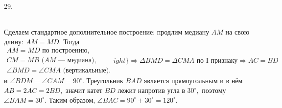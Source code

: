 29. \begin{figure}[ht!]
\end{figure}\\
Сделаем стандартное дополнительное построение: продлим медиану $AM$ на свою длину: $AM=MD.$ Тогда $\left.\begin{array}{l}AM=MD\text{ по построению},\\
 CM=MB\text{ ($AM$ --- медиана)},\\ \angle BMD=\angle CMA\text{ (вертикальные).}\end{array}
ight\}\Rightarrow
\Delta BMD=\Delta CMA\text{ по I признаку}\Rightarrow AC=BD$ и $\angle BDM=\angle CAM=90^\circ.$ Треугольник $BAD$ является прямоугольным и в нём $AB=2AC=2BD,$ значит катет $BD$ лежит напротив угла в $30^\circ,$ поэтому $\angle BAM=30^\circ.$ Таким образом, $\angle BAC=90^\circ+30^\circ=120^\circ.$\\

